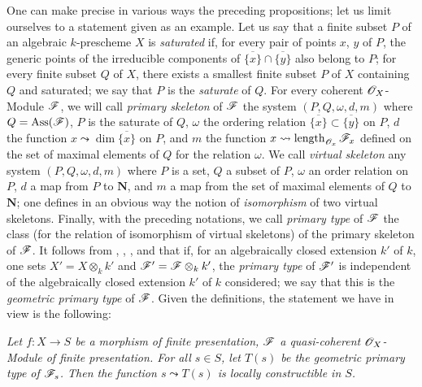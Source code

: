 \begin{remark}[9.8.9]
\label{IV.9.8.9}
One can make precise in various ways the preceding propositions; let us limit ourselves to a statement given as an example.
Let us say that a finite subset $P$ of an algebraic $k$-prescheme $X$ is \emph{saturated} if, for every pair of points $x$, $y$ of $P$, the generic points of the irreducible components of $\overline{\{x\}}\cap\overline{\{y\}}$ also belong to $P$; for every finite subset $Q$ of $X$, there exists a smallest finite subset $P$ of $X$ containing $Q$ and saturated; we say that $P$ is the \emph{saturate} of $Q$.
For every coherent $\mathscr{O}_X$-Module $\mathscr{F}$, we will call \emph{primary skeleton} of $\mathscr{F}$ the system $(P,Q,\omega,d,m)$ where $Q=\operatorname{Ass}(\mathscr{F})$, $P$ is the saturate of $Q$, $\omega$ the ordering relation $\overline{\{x\}}\subset\overline{\{y\}}$ on $P$, $d$ the function $x\leadsto\dim\overline{\{x\}}$ on $P$, and $m$ the function $x\leadsto\operatorname{length}_{\mathscr{O}_x}\mathscr{F}_x$ defined on the set of maximal elements of $Q$ for the relation $\omega$.
We call \emph{virtual skeleton} any system $(P,Q,\omega,d,m)$ where $P$ is a set, $Q$ a subset of $P$, $\omega$ an order relation on $P$, $d$ a map from $P$ to $\mathbf{N}$, and $m$ a map from the set of maximal elements of $Q$ to $\mathbf{N}$; one defines in an obvious way the notion of \emph{isomorphism} of two virtual skeletons.
Finally, with the preceding notations, we call \emph{primary type} of $\mathscr{F}$ the class (for the relation of isomorphism of virtual skeletons) of the primary skeleton of $\mathscr{F}$.
It follows from , , ,  and  that if, for an algebraically closed extension $k'$ of $k$, one sets $X'=X\otimes_k k'$ and $\mathscr{F}'=\mathscr{F}\otimes_k k'$, the \emph{primary type} of $\mathscr{F}'$ is independent of
the algebraically closed extension $k'$ of $k$ considered; we say that this is the \emph{geometric primary type} of $\mathscr{F}$.
Given the definitions, the statement we have in view is the following:

\medskip
\noindent
\emph{}
\textit{Let $f:X\to S$ be a morphism of finite presentation, $\mathscr{F}$ a quasi-coherent $\mathscr{O}_X$-Module of finite presentation.
For all $s\in S$, let $T(s)$ be the geometric primary type of $\mathscr{F}_s$.
Then the function $s\leadsto T(s)$ is locally constructible in $S$.}


\end{remark}
